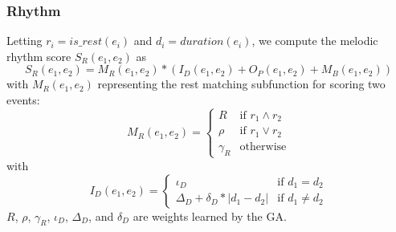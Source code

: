 \documentclass[phd,electronic,oneside,twosidetoc,letterpaper,chaptercenter,parttop,lol,lof,lot]{byumsphd}
\begin{document}
\subsubsection{Rhythm}

Letting $r_i = is\_rest(e_i)$ and $d_i = duration(e_i)$, we compute the melodic rhythm score $S_R(e_1,e_2)$ as 
\[
S_R(e_1,e_2) = M_R(e_1,e_2) * (I_D(e_1,e_2) + O_P(e_1,e_2) + M_B(e_1,e_2))
\]
\noindent with $M_R(e_1,e_2)$ representing the rest matching subfunction for scoring two events:
\[ M_R(e_1,e_2) = 
  \begin{cases}
  	R & \text{if } r_1 \land r_2 \\
    \rho & \text{if } r_1 \lor r_2 \\
    \gamma_R & \text{otherwise}
  \end{cases}
\]
\noindent with
\[ I_D(e_1,e_2) = 
  \begin{cases}
  	\iota_D & \text{if } d_1 = d_2 \\
    \Delta_D + \delta_D * |d_1-d_2| & \text{if } d_1 \neq d_2
  \end{cases}
\]
\noindent $R$, $\rho$, $\gamma_R$, $\iota_D$, $\Delta_D$, and $\delta_D$ are weights learned by the GA.
\end{document}
